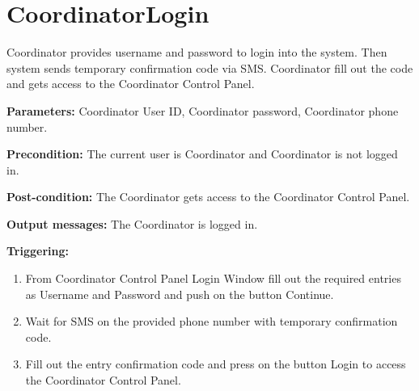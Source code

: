 \section{CoordinatorLogin}
\label{operation:CoordinatorLogin}
Coordinator provides username and password to login into the system. 
Then system sends temporary confirmation code via SMS. 
Coordinator fill out the code and gets access to the Coordinator Control Panel.
\begin{description}

\item \textbf{Parameters:} Coordinator User ID, Coordinator password,
Coordinator phone number.
\item \textbf{Precondition:} The current user is Coordinator and Coordinator is
not logged in.
\item \textbf{Post-condition:} The Coordinator gets access to the
Coordinator Control Panel.
\item \textbf{Output messages:} The Coordinator is logged in.

\item \textbf{Triggering:}
\begin{enumerate}
\item From Coordinator Control Panel Login Window fill out the required entries as Username and Password and push on the button Continue.
\item Wait for SMS on the provided phone number with temporary confirmation code.
\item Fill out the entry confirmation code and press on the button Login to
access the Coordinator Control Panel.
\end{enumerate}
 
\end{description}

